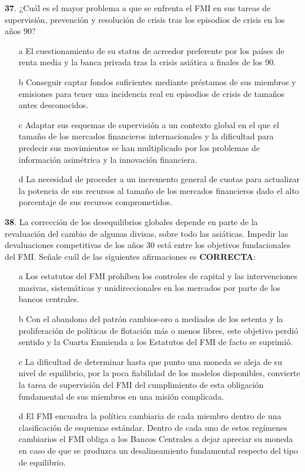 \documentclass{nuevotema}
\begin{document}
\textbf{37}. ¿Cuál es el mayor problema a que se enfrenta el FMI en sus tareas de supervisión, prevención y resolución de crisis tras los episodios de crisis en los años 90?

\begin{enumerate}
	\item[a] El cuestionamiento de su status de acreedor preferente por los países de renta media y la banca privada tras la crisis asiática a finales de los 90.
	\item[b] Conseguir captar fondos suficientes mediante préstamos de sus miembros y emisiones para tener una incidencia real en episodios de crisis de tamaños antes desconocidos. 
	\item[c] Adaptar sus esquemas de supervisión a un contexto global en el que el tamaño de los mercados financieros internacionales y la dificultad para predecir sus movimientos se han multiplicado por los problemas de información asimétrica y la innovación financiera.
	\item[d] La necesidad de proceder a un incremento general de cuotas para actualizar la potencia de sus recursos al tamaño de los mercados financieros dado el alto porcentaje de sus recursos comprometidos.
\end{enumerate}

\textbf{38}. La corrección de los desequilibrios globales depende en parte de la revaluación del cambio de algunas divisas, sobre todo las asiáticas. Impedir las devaluaciones competitivas de los años 30 está entre los objetivos fundacionales del FMI. Señale cuál de las siguientes afirmaciones es \textbf{CORRECTA}:

\begin{enumerate}
	\item[a] Los estatutos del FMI prohíben los controles de capital y las intervenciones masivas, sistemáticas y unidireccionales en los mercados por parte de los bancos centrales.
	\item[b] Con el abandono del patrón cambios-oro a mediados de los setenta y la proliferación de políticas de flotación más o menos libres, este objetivo perdió sentido y la Cuarta Enmienda a los Estatutos del FMI de facto se suprimió.
	\item[c] La dificultad de determinar hasta que punto una moneda se aleja de su nivel de equilibrio, por la poca fiabilidad de los modelos disponibles, convierte la tarea de supervisión del FMI del cumplimiento de esta obligación fundamental de sus miembros en una misión complicada.
	\item[d] El FMI encuadra la política cambiaria de cada miembro dentro de una clasificación de esquemas estándar. Dentro de cada uno de estos regímenes cambiarios el FMI obliga a los Bancos Centrales a dejar apreciar su moneda en caso de que se produzca un desalineamiento fundamental respecto del tipo de equilibrio.
\end{enumerate}
\end{document}
